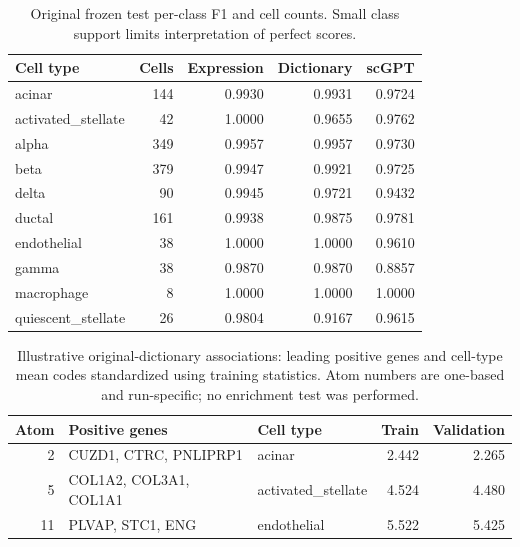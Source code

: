 \begin{table}[htbp]\centering\small
\caption{Original frozen test per-class F1 and cell counts. Small class support limits interpretation of perfect scores.}
\begin{tabular}{lrrrr}\toprule
Cell type & Cells & Expression & Dictionary & scGPT\\\midrule
acinar & 144 & 0.9930 & 0.9931 & 0.9724\\
activated\_stellate & 42 & 1.0000 & 0.9655 & 0.9762\\
alpha & 349 & 0.9957 & 0.9957 & 0.9730\\
beta & 379 & 0.9947 & 0.9921 & 0.9725\\
delta & 90 & 0.9945 & 0.9721 & 0.9432\\
ductal & 161 & 0.9938 & 0.9875 & 0.9781\\
endothelial & 38 & 1.0000 & 1.0000 & 0.9610\\
gamma & 38 & 0.9870 & 0.9870 & 0.8857\\
macrophage & 8 & 1.0000 & 1.0000 & 1.0000\\
quiescent\_stellate & 26 & 0.9804 & 0.9167 & 0.9615\\
\bottomrule\end{tabular}\end{table}

\begin{table}[htbp]\centering\small
\caption{Illustrative original-dictionary associations: leading positive genes and cell-type mean codes standardized using training statistics. Atom numbers are one-based and run-specific; no enrichment test was performed.}
\begin{tabular}{rl lrr}\toprule
Atom & Positive genes & Cell type & Train & Validation\\\midrule
2 & CUZD1, CTRC, PNLIPRP1 & acinar & 2.442 & 2.265\\
5 & COL1A2, COL3A1, COL1A1 & activated\_stellate & 4.524 & 4.480\\
11 & PLVAP, STC1, ENG & endothelial & 5.522 & 5.425\\
\bottomrule\end{tabular}\end{table}
